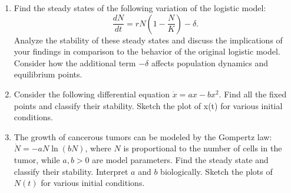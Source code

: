 \begin{enumerate}
    \item Find the steady states of the following variation of the logistic model:
    \begin{equation*}
        \frac{dN}{dt} = r N \left( 1 - \frac{N}{K} \right) - \delta.
    \end{equation*}
    Analyze the stability of these steady states and discuss the implications of your findings in comparison to the behavior of the original logistic model. Consider how the additional term \(-\delta\) affects population dynamics and equilibrium points.
    \item Consider the following differential equation $\dot{x} = a x - b x^2$. Find all the fixed points and classify their stability. Sketch the plot of x(t) for various initial conditions.
    \item The growth of cancerous tumors can be modeled by the Gompertz law: $\dot{N} = -aN\ln(bN)$, where $N$ is proportional to the number of cells in the tumor, while $a,b>0$ are model parameters. Find the steady state and classify their stability. Interpret $a$ and $b$ biologically. Sketch the plots of $N(t)$ for various initial conditions.
  \end{enumerate}